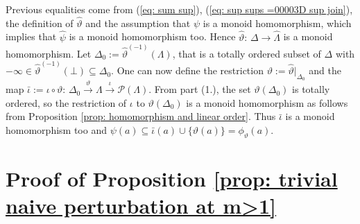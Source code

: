 \documentclass[11pt,british,reqno]{article}
\numberwithin{equation}{section}
\numberwithin{figure}{section}
\numberwithin{table}{section}
\theoremstyle{definition}
\theoremstyle{definition}
\theoremstyle{plain}
\theoremstyle{plain}
\theoremstyle{remark}
\theoremstyle{plain}
\numberwithin{equation}{section}
\numberwithin{figure}{section}
\numberwithin{table}{section}
\theoremstyle{plain}
\begin{document}
\begin{enumerate}
Previous equalities come from (\ref{eq: sum sup}), (\ref{eq: sup sups =00003D sup join}),
the definition of $\hat{\vartheta}$ and the assumption that $\psi$
is a monoid homomorphism, which implies that $\hat{\psi}$ is a
monoid homomorphism too. Hence $\hat{\vartheta}:\,\Delta\longrightarrow\hat{\Lambda}$
is a monoid homomorphism. Let $\Delta_{0}:=\hat{\vartheta}^{(-1)}(\Lambda)$,
that is a totally ordered subset of $\Delta$ with $-\infty \in \hat{\vartheta}^{(-1)}(\bot)\subseteq\Delta_{0}$. One can now define
the restriction $\vartheta:=\hat{\vartheta}|_{\Delta_{0}}$ and the
map $\bar{\iota}:=\iota\circ\vartheta:\,\Delta_{0}\overset{\vartheta}{\longrightarrow}\Lambda\overset{\iota}{\longrightarrow}\mathcal{P}(\Lambda)$.
From part (1.), the set $\vartheta(\Delta_{0})$ is totally ordered,
so the restriction of $\iota$ to $\vartheta(\Delta_{0})$ is a monoid
homomorphism as follows from Proposition \ref{prop: homomorphism and linear order}.
Thus $\bar{\iota}$ is a monoid homomorphism too and $\psi(a)\subseteq\bar{\iota}(a)\cup\{\vartheta(a)\}=\phi_{\vartheta}(a)$. 
\end{enumerate}

\section{\label{sec: Appendix C} Proof of Proposition \ref{prop: trivial naive perturbation at m>1}}
\end{document}

